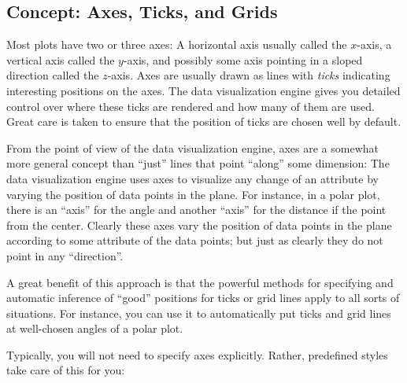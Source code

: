 \subsection{Concept: Axes, Ticks, and Grids}

Most plots have two or three axes: A horizontal axis usually called the
$x$-axis, a vertical axis called the $y$-axis, and possibly some axis pointing
in a sloped direction called the $z$-axis. Axes are usually drawn as lines with
\emph{ticks} indicating interesting positions on the axes. The data
visualization engine gives you detailed control over where these ticks are
rendered and how many of them are used. Great care is taken to ensure that the
position of ticks are chosen well by default.

From the point of view of the data visualization engine, axes are a somewhat
more general concept than ``just'' lines that point ``along'' some dimension:
The data visualization engine uses axes to visualize any change of an attribute
by varying the position of data points in the plane. For instance, in a polar
plot, there is an ``axis'' for the angle and another ``axis'' for the distance
if the point from the center. Clearly these axes vary the position of data
points in the plane according to some attribute of the data points; but just as
clearly they do not point in any ``direction''.

A great benefit of this approach is that the powerful methods for specifying
and automatic inference of ``good'' positions for ticks or grid lines apply to
all sorts of situations. For instance, you can use it to automatically put
ticks and grid lines at well-chosen angles of a polar plot.

Typically, you will not need to specify axes explicitly. Rather, predefined
styles take care of this for you:
%
\begin{codeexample}[]
\end{codeexample}

\begin{codeexample}[]
\end{codeexample}

